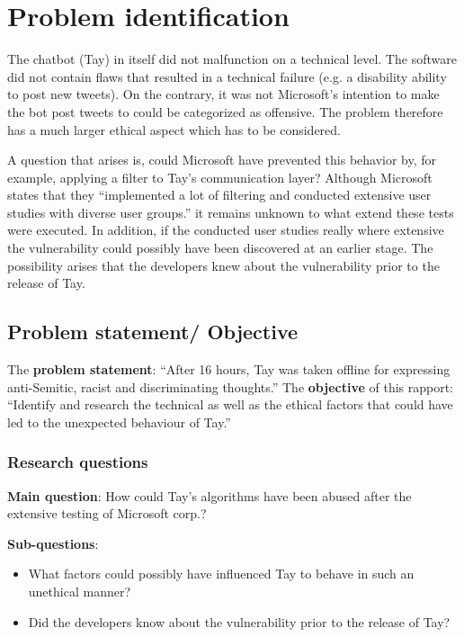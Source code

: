 \chapter{Problem identification}
The chatbot (Tay) in itself did not malfunction on a technical level. The software did not contain flaws that resulted in a technical failure (e.g. a disability ability to post new tweets). On the contrary, it was not Microsoft’s intention to make the bot post tweets to could be categorized as offensive. The problem therefore has a much larger ethical aspect which has to be considered.

A question that arises is, could Microsoft have prevented this behavior by, for example, applying a filter to Tay’s communication layer? Although Microsoft states that they “implemented a lot of filtering and conducted extensive user studies with diverse user groups.”\cite{statementpeterlee} it remains unknown to what extend these tests were executed. In addition, if the conducted user studies really where extensive the vulnerability could possibly have been discovered at an earlier stage. The possibility arises that the developers knew about the vulnerability prior to the release of Tay.

\section{Problem statement/ Objective}
The \textbf{problem statement}: “After 16 hours, Tay was taken offline for expressing anti-Semitic, racist and discriminating thoughts.”
The \textbf{objective} of this rapport: “Identify and research the technical as well as the ethical factors that could have led to the unexpected behaviour of Tay.”

\subsection{Research questions}
\textbf{Main question}: How could Tay’s algorithms have been abused after the extensive testing of Microsoft corp.?

\textbf{Sub-questions}:
\begin{itemize}
	\item What factors could possibly have influenced Tay to behave in such an unethical manner?
	\item Did the developers know about the vulnerability prior to the release of Tay?
\end{itemize}